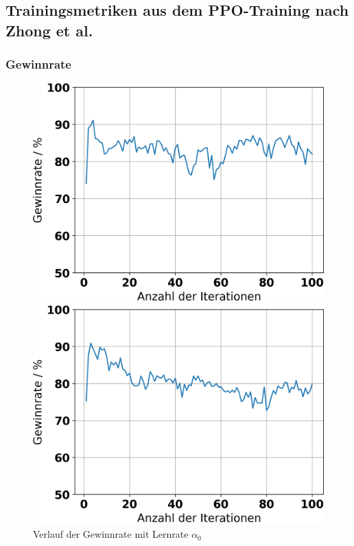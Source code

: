 \subsection{Trainingsmetriken aus dem PPO-Training nach Zhong et al.}

\label{appendix-training-zhong}

\subsubsection{Gewinnrate}

\begin{figure}[H]
	\begin{minipage}[c]{0.32\linewidth}
		\includegraphics[width=\linewidth]{Bilder/ensemble-training/a_0_001/graph_win_rates.png}
		\caption{Verlauf der Gewinnrate mit Lernrate $\alpha_0$}
	\end{minipage}
	\hfill
	\begin{minipage}[c]{0.32\linewidth}
		\includegraphics[width=\linewidth]{Bilder/ensemble-training/b_0_0003/graph_win_rates.png}

\end{minipage}
\end{figure}
